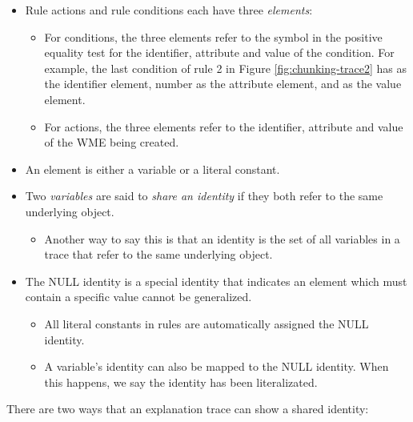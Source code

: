 \begin{itemize}
	\item Rule actions and rule conditions each have three \textit{elements}:
	\vspace{-6pt}
	\begin{itemize}
		\item For conditions, the three elements refer to the symbol in the positive equality test for the identifier, attribute and value of the condition.  For example, the last condition of rule 2 in Figure \ref{fig:chunking-trace2} has  as the identifier element, number as the attribute element, and  as the value element.
		\vspace{-6pt}
		\item For actions, the three elements refer to the identifier, attribute and value of the WME being created.
	\end{itemize}
	\vspace{-6pt}
	\item An element is either a variable or a literal constant.
	\vspace{-6pt}
	\item Two \textit{variables} are said to \textit{share an identity} if they both refer to the same underlying object.
	\vspace{-6pt}
	\begin{itemize}
		\item Another way to say this is that an identity is the set of all variables in a trace that refer to the same underlying object.
	\end{itemize}
	\vspace{-6pt}
	\item The NULL identity is a special identity that indicates an element which must contain a specific value cannot be generalized.
	\vspace{-6pt}
	\begin{itemize}
		\item All literal constants in rules are automatically assigned the NULL identity.
		\vspace{-6pt}
		\item A variable's identity can also be mapped to the NULL identity.  When this happens, we say the identity has been literalizated.
	\end{itemize}
	\vspace{-6pt}
\end{itemize}

There are two ways that an explanation trace can show a shared identity:

